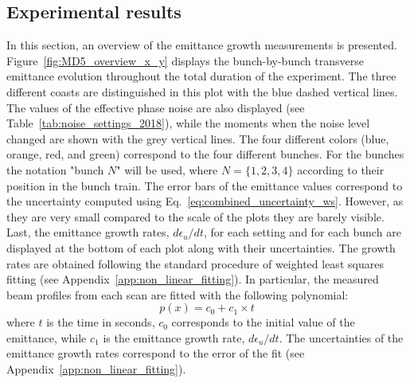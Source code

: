 \subsection{Experimental results}\label{sec:MD5_overview}
In this section, an overview of the emittance growth measurements is presented. Figure~\ref{fig:MD5_overview_x_y} displays the bunch-by-bunch transverse emittance evolution throughout the total duration of the experiment. The three different coasts are distinguished in this plot with the blue dashed vertical lines. The values of the effective phase noise are also displayed (see Table~\ref{tab:noise_settings_2018}), while the moments when the noise level changed are shown with the grey vertical lines. The four different colors (blue, orange, red, and green) correspond to the four different bunches. For the bunches the notation "bunch $N$" will be used, where $N=\{1,2,3,4\}$ according to their position in the bunch train. The error bars of the emittance values correspond to the uncertainty computed using Eq.~\ref{eq:combined_uncertainty_ws}. However, as they are very small compared to the scale of the plots they are barely visible. Last, the emittance growth rates, $d\epsilon_u /dt$, for each setting and for each bunch are displayed at the bottom of each plot along with their uncertainties. The growth rates are obtained following the standard procedure of weighted least squares fitting (see Appendix~\ref{app:non_linear_fitting}). In particular, the measured beam profiles from each scan are fitted with the following polynomial:
\begin{equation}\label{eq:polynimial_for_linear_fit}
   p(x) = c_0 + c_1 \times t
\end{equation}
where $t$ is the time in seconds, %
$c_0$ corresponds to the initial value of the emittance, while $c_1$ is the emittance growth rate, $d\epsilon_u /dt$. The uncertainties of the emittance growth rates correspond to the error of the fit (see Appendix~\ref{app:non_linear_fitting}).

